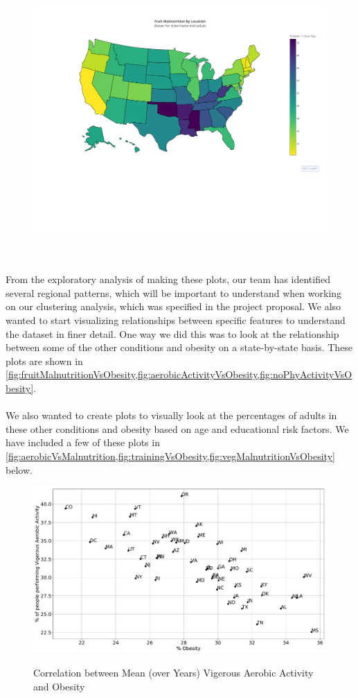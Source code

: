\documentclass{article}
\begin{document}
\begin{figure}[h]
\centering
\caption{}
\includegraphics[width=\linewidth]{images/exploration_d3_map_fruit_mal_adults.pdf}
\label{fig:fruitMalnutritionByLocation}
\end{figure}
\\\\
From the exploratory analysis of making these plots, our team has identified several regional patterns, which will be important to understand when working on our clustering analysis, which was specified in the project proposal.
We also wanted to start visualizing relationships between specific features to understand the dataset in finer detail. One way we did this was to look at the relationship between some of the other conditions and obesity on a state-by-state basis. These plots are shown in \cref{fig:fruitMalnutritionVsObesity,fig:aerobicActivityVsObesity,fig:noPhyActivityVsObesity}. 
\\\\
We also wanted to create plots to visually look at the percentages of adults in these other conditions and obesity based on age and educational risk factors. We have included a few of these plots in \cref{fig:aerobicVsMalnutrition,fig:trainingVsObesity,fig:vegMalnutritionVsObesity} below.
\begin{figure}[h]
\centering
\caption{Correlation between Mean (over Years) Vigerous Aerobic Activity and Obesity}
\includegraphics[width=\linewidth]{images/exploration_vigerous_aerobic_vs_obesity.pdf}
\label{fig:aerobicActivityVsObesity}
\end{figure}
\end{document}
